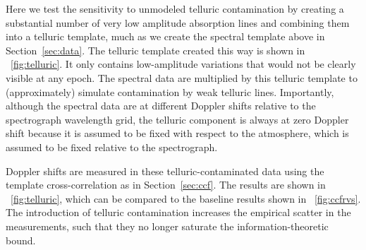 \documentclass[modern]{aastex631}
\newcommand{\sectionname}{Section}
\newcommand{\secref}[1]{\sectionname~\ref{#1}}
\newcommand{\figref}[1]{\figurename~\ref{#1}}
\begin{document}
Here we test the sensitivity to unmodeled telluric contamination by creating a substantial number of very low amplitude absorption lines and combining them into a telluric template, much as we create the spectral template above in \secref{sec:data}.
The telluric template created this way is shown in \figref{fig:telluric}.
It only contains low-amplitude variations that would not be clearly visible at any epoch.
The spectral data are multiplied by this telluric template to (approximately) simulate contamination by weak telluric lines.
Importantly, although the spectral data are at different Doppler shifts relative to the spectrograph wavelength grid, the telluric component is always at zero Doppler shift because it is assumed to be fixed with respect to the atmosphere, which is assumed to be fixed relative to the spectrograph.

Doppler shifts are measured in these telluric-contaminated data using the template cross-correlation as in \secref{sec:ccf}.
The results are shown in  \figref{fig:telluric}, which can be compared to the baseline results shown in \figref{fig:ccfrvs}.
The introduction of telluric contamination increases the empirical scatter in the measurements, such that they no longer saturate the information-theoretic bound.
\end{document}
